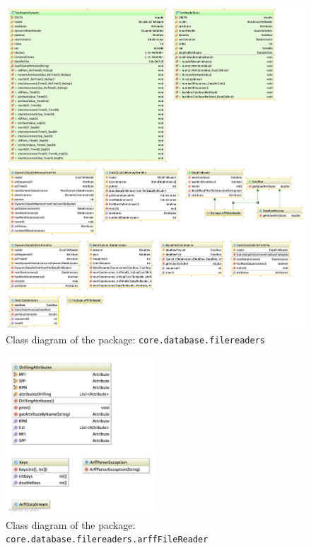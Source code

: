 \begin{figure}[h!]
  \caption{Class diagram of the package: \texttt{core.database.filereaders}}
  \centering
    \includegraphics[width=\textwidth]{ClassDiagrams/core_database_filereaders.jpg}
\end{figure}

\begin{figure}[h!]
  \caption{Class diagram of the package: \texttt{core.database.filereaders.arffFileReader}}
  \centering
    \includegraphics[width=0.5\textwidth]{ClassDiagrams/core_database_filereaders_arfffilereader.jpg}
\end{figure}

